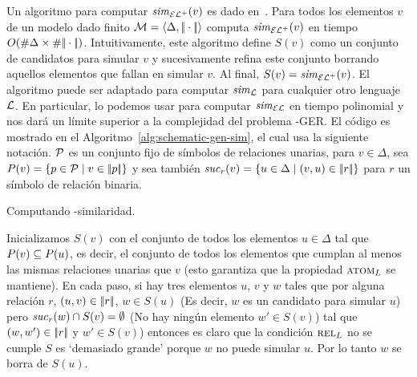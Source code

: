 Un algoritmo para computar ${\it sim}_{{\mathcal{EL}^+}}(v)$ es dado en~\cite{HHK95}. Para todos los
elementos $v$ de un modelo dado finito
$\mathcal{M}=\langle \Delta,|\!|\cdot|\!| \rangle$
computa ${\it sim}_{{\mathcal{EL}^+}}(v)$ en tiempo $O(\# \Delta\times\# {|\!|\cdot|\!|})$.
Intuitivamente, este algoritmo
define $S(v)$ como un conjunto de candidatos para simular $v$ y
sucesivamente refina este conjunto borrando aquellos elementos que fallan en simular $v$.
Al final, $S(v)={\it sim}_{\mathcal{EL}^+}(v)$. El algoritmo puede ser adaptado para
computar ${\it sim}_{\mathcal{L}}$ para cualquier otro lenguaje $\mathcal{L}$. En particular,
lo podemos usar para computar ${\it sim}_\mathcal{EL}$ en tiempo polinomial y nos dar\'a un l\'imite superior a la
complejidad del problema \EL-GER. 
El c\'odigo es mostrado en el
Algoritmo~\ref{alg:schematic-gen-sim}, el cual usa la siguiente
notaci\'on. $\mathcal{P}$ es un conjunto fijo de s\'imbolos de relaciones unarias, para $v\in
\Delta$, sea $P(v)=\{p\in\mathcal{P}\mid v\in|\!|p|\!|\}$ y sea tambi\'en
${\it suc}_{r}(v)=\{u\in\Delta\mid(v,u)\in|\!|r|\!|\}$ para $r$ un s\'imbolo de relaci\'on binaria.\\



\begin{megaalgorithm}
\small

\caption{ Computando \EL-similaridad.}\label{alg:schematic-gen-sim}


 \BlankLine



\end{megaalgorithm}

Inicializamos $S(v)$ con
el conjunto de todos los elementos $u\in\Delta$ tal que $P(v)\subseteq
P(u)$, es decir, el conjunto de todos los elementos que cumplan al menos las
mismas relaciones unarias que $v$ (esto garantiza que la propiedad $\textsc{atom}_L$ se mantiene).
En cada paso, si hay tres elementos $u$, $v$ y $w$ tales que
por alguna relaci\'on $r$, $(u,v) \in |\!|r|\!|$, $w\in S(u)$
(Es decir, $w$ es un candidato para simular $u$) pero ${\it suc}_{r}(w)\cap S(v) = \emptyset$
(No hay ning\'un elemento $w'\in S(v)$) tal que $(w, w') \in |\!|r|\!|$
y $w'\in S(v)$) entonces es claro que la condici\'on $\textsc{rel}_L$ no se cumple $S$ es `demasiado grande' porque
$w$ no puede simular $u$. Por lo tanto $w$ se borra de $S(u)$.


